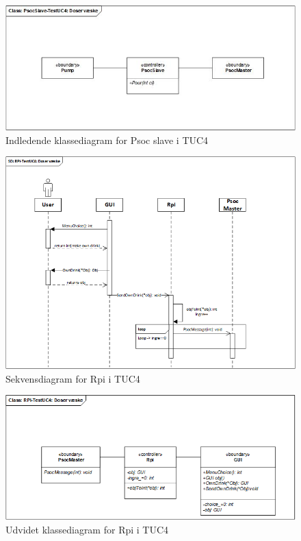 \begin{figure}[H]
    \centering
    \includegraphics[width=1\textwidth]{Images/PsocSlaveTUC4.jpg}
    \caption{Indledende klassediagram for Psoc slave i TUC4}
    \label{fig:cdTUC4Rpi}
\end{figure}


\begin{figure}[H]
    \centering
    \includegraphics[width=1\textwidth]{Images/Applikationsmodeller/rpi/rpi_sekvensdiagramTestUC4.png}
    \caption{Sekvensdiagram for Rpi i TUC4}
    \label{fig:sdTUC4Rpi}
\end{figure}

\begin{figure}[H]
    \centering
    \includegraphics[width=1\textwidth]{Images/Applikationsmodeller/rpi/rpi_UdvidetklassediagramTestUC4.png}
    \caption{Udvidet klassediagram for Rpi i TUC4}
    \label{fig:UcdTUC4Rpi}
\end{figure}

